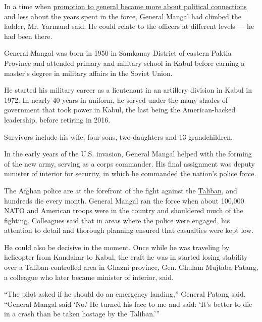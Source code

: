 In a time when
\href{https://www.nytimes.com/2016/12/19/world/what-in-the-world/being-an-afghan-general-is-nice-work-if-you-can-get-it-and-many-do.html}{promotion
to general became more about political connections} and less about the
years spent in the force, General Mangal had climbed the ladder, Mr.
Yarmand said. He could relate to the officers at different levels --- he
had been there.

General Mangal was born in 1950 in Samkanay District of eastern Paktia
Province and attended primary and military school in Kabul before
earning a master's degree in military affairs in the Soviet Union.

He started his military career as a lieutenant in an artillery division
in Kabul in 1972. In nearly 40 years in uniform, he served under the
many shades of government that took power in Kabul, the last being the
American-backed leadership, before retiring in 2016.

Survivors include his wife, four sons, two daughters and 13
grandchildren.

In the early years of the U.S. invasion, General Mangal helped with the
forming of the new army, serving as a corps commander. His final
assignment was deputy minister of interior for security, in which he
commanded the nation's police force.

The Afghan police are at the forefront of the fight against the
\href{https://www.nytimes.com/2020/04/24/world/asia/taliban-attacks-afghanistan-coronavirus.html}{Taliban},
and hundreds die every month. General Mangal ran the force when about
100,000 NATO and American troops were in the country and shouldered much
of the fighting. Colleagues said that in areas where the police were
engaged, his attention to detail and thorough planning ensured that
casualties were kept low.

He could also be decisive in the moment. Once while he was traveling by
helicopter from Kandahar to Kabul, the craft he was in started losing
stability over a Taliban-controlled area in Ghazni province, Gen. Ghulam
Mujtaba Patang, a colleague who later became minister of interior, said.

``The pilot asked if he should do an emergency landing,'' General Patang
said. ``General Mangal said `No.' He turned his face to me and said:
`It's better to die in a crash than be taken hostage by the Taliban.'''

\href{https://www.nytimes.com/interactive/2020/obituaries/people-died-coronavirus-obituaries.html?action=click\&pgtype=Article\&state=default\&region=BELOW_MAIN_CONTENT\&context=covid_obits_promo}{}

